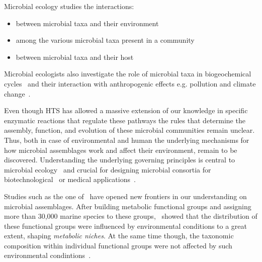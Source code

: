 
      Microbial ecology studies the interactions: 

      \begin{itemize}
         \item between microbial taxa and their environment
         \item among the various microbial taxa present in a community
         \item between microbial taxa and their host~\cite{isme}
      \end{itemize}

      Microbial ecologists also investigate the role of microbial taxa in 
      biogeochemical cycles~\cite{falkowski2008microbial} and their interaction 
      with anthropogenic effects e.g. pollution and climate change~\cite{cavicchioli2019scientists}.

      Even though HTS has allowed a massive extension of our knowledge in  
      specific enzymatic reactions that regulate these pathways the rules that determine 
      the assembly, function, and evolution of these microbial communities remain unclear. 
      Thus, both in case of environmental and human
      the underlying mechanisms for how microbial assemblages work and affect their environment, remain to be discovered.
      Understanding the underlying governing principles is central to microbial ecology~\cite{giri2021metabolic} and crucial for designing microbial consortia for biotechnological~\cite{giri2020harnessing} or medical applications~\cite{kong2018designing}.

      Studies such as the one of~\citeauthor{louca2016decoupling}
      have opened new frontiers in our understanding on microbial assemblages. 
      After building metabolic functional groups and assigning more than 30,000 marine 
      species to these groups,~\citeauthor{louca2016decoupling} showed 
      that the distribution of these functional groups were influenced by environmental 
      conditions to a great extent, shaping \textit{metabolic niches}.
      At the same time though, the taxonomic composition within individual functional groups
      were not affected by such environmental condintions~\cite{louca2016decoupling}.


